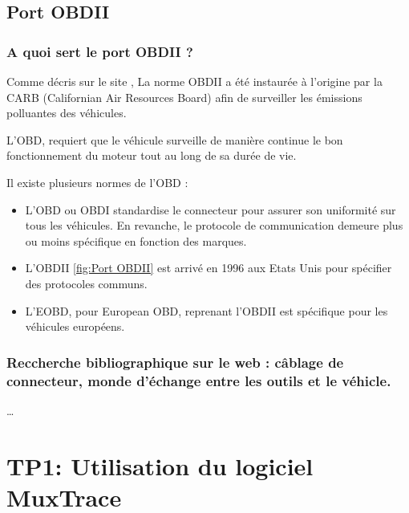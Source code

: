 \documentclass{rapportECC}
\begin{document}
\subsection{Port OBDII}

\subsubsection*{A quoi sert le port OBDII ?}

Comme décris sur le site \cite{klavkarr}, La norme OBDII a été instaurée à l'origine par la CARB (Californian Air Resources Board) afin de surveiller les émissions polluantes des véhicules.  

L'OBD, requiert que le véhicule surveille de manière continue le bon fonctionnement du moteur tout au long de sa durée de vie.

Il existe plusieurs normes de l'OBD : 
\begin{itemize}
    \item L'OBD ou OBDI standardise le connecteur pour assurer son uniformité sur tous les véhicules. En revanche, le protocole de communication demeure plus ou moins spécifique en fonction des marques.
    \item L'OBDII \ref{fig:Port OBDII} est arrivé en 1996 aux Etats Unis pour spécifier des protocoles communs.
    \item L'EOBD, pour European OBD, reprenant l'OBDII est spécifique pour les véhicules européens.
\end{itemize}
    
\subsubsection*{Reccherche bibliographique sur le web : câblage de connecteur, monde d'échange entre les outils et le véhicle.}

\dots


\section{TP1: Utilisation du logiciel MuxTrace}

\end{document}
